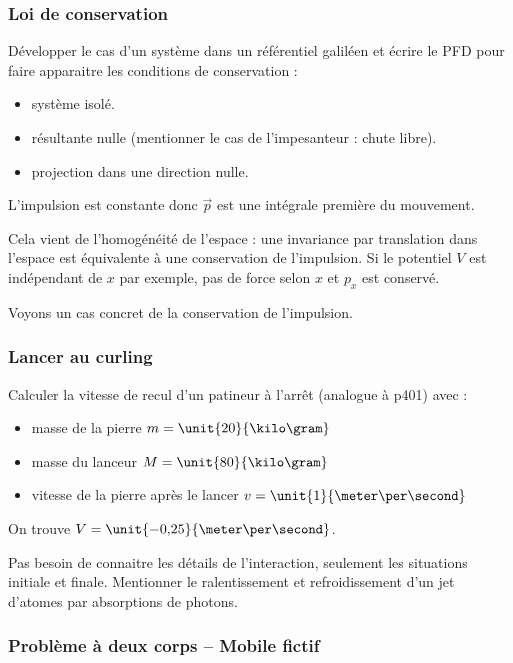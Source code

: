 \subsubsection{Loi de conservation}

Développer le cas d'un système dans un référentiel galiléen et écrire le PFD pour faire apparaitre les conditions de conservation :
\begin{itemize}
\item système isolé.
\item résultante nulle (mentionner le cas de l'impesanteur : chute libre).
\item projection dans une direction nulle.
\end{itemize}
L'impulsion est constante donc $\overrightarrow{p}$ est une intégrale première du mouvement.

Cela vient de l'homogénéité de l'espace : une invariance par translation dans l'espace est équivalente à une conservation de l'impulsion.
Si le potentiel $V$ est indépendant de $x$ par exemple, pas de force selon $x$ et $p_x$ est conservé.

\begin{transition}
Voyons un cas concret de la conservation de l'impulsion.
\end{transition}

\subsubsection{Lancer au curling}

Calculer la vitesse de recul d'un patineur à l'arrêt (analogue à \cite{Bocquet2002} p401) avec :
\begin{itemize}
\item masse de la pierre $m=\unit{20}{\kilo\gram}$
\item masse du lanceur $M=\unit{80}{\kilo\gram}$
\item vitesse de la pierre après le lancer $v=\unit{1}{\meter\per\second}$
\end{itemize}
On trouve $V=\unit{-0{,}25}{\meter\per\second}$.

\begin{transition}
Pas besoin de connaitre les détails de l'interaction, seulement les situations initiale et finale.
Mentionner le ralentissement et refroidissement d'un jet d'atomes par absorptions de photons.
\end{transition}

\subsubsection{Problème à deux corps -- Mobile fictif}

